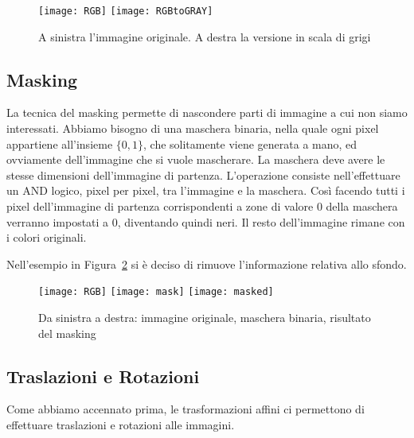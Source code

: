 \begin{figure}[ht]
  \begin{center}
    \texttt{[image: RGB]}
    \texttt{[image: RGBtoGRAY]}
    \label{fig:rgb2gray_example}
    \caption{A sinistra l'immagine originale. A destra la versione in scala di grigi}
  \end{center}
\end{figure}


\clearpage
\subsection {Masking}
La tecnica del masking permette di nascondere parti di immagine a cui non siamo interessati.
Abbiamo bisogno di una maschera binaria, nella quale ogni pixel appartiene all'insieme $\{0,1\}$, che solitamente viene generata a mano, ed ovviamente dell'immagine che si vuole mascherare.
La maschera deve avere le stesse dimensioni dell'immagine di partenza.
L'operazione consiste nell'effettuare un AND logico, pixel per pixel,  tra l'immagine e la maschera.
Così facendo tutti i pixel dell'immagine di partenza corrispondenti a zone di valore $0$ della maschera verranno impostati a $0$, diventando quindi neri.
Il resto dell'immagine rimane con i colori originali.

Nell'esempio in Figura~\ref{fig:mask_example} si è deciso di rimuove l'informazione relativa allo sfondo.
\begin{figure}[ht] %
  \begin{center}
    \texttt{[image: RGB]}
    \texttt{[image: mask]}
    \texttt{[image: masked]}
    \label{fig:mask_example}
    \caption{Da sinistra a destra: immagine originale, maschera binaria, risultato del masking}
  \end{center}
\end{figure}


\clearpage
\subsection {Traslazioni e Rotazioni}
Come abbiamo accennato prima, le trasformazioni affini ci permettono di effettuare traslazioni e rotazioni alle immagini.

